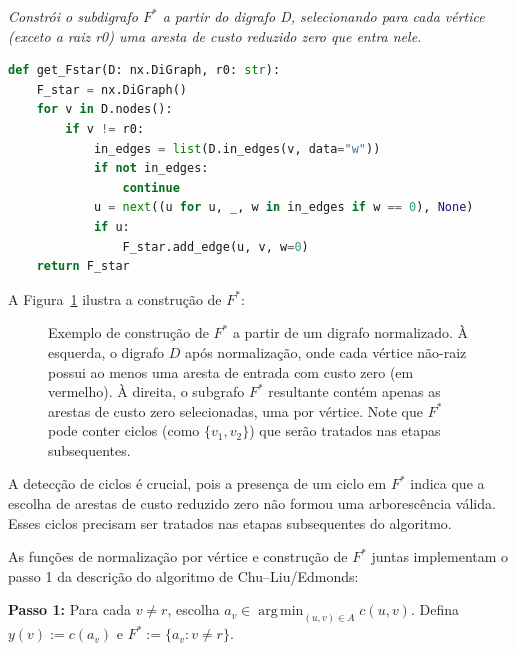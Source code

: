 \begin{tcolorbox}[
        enhanced, breakable,
        colframe=blue!60!black, colback=blue!2,
        colbacktitle=blue!15, coltitle=black,
        title={Construção de F star },
        boxed title style={sharp corners, boxrule=0.6pt},
        sharp corners, boxrule=0.6pt
    ]
    \emph{Constrói o subdigrafo $F^*$ a partir do digrafo D, selecionando para cada vértice (exceto a raiz r0) uma aresta de custo reduzido zero que entra nele.}
    \tcblower
    \begin{lstlisting}[mathescape=true, language=Python]
def get_Fstar(D: nx.DiGraph, r0: str):
    F_star = nx.DiGraph()
    for v in D.nodes():
        if v != r0:
            in_edges = list(D.in_edges(v, data="w"))
            if not in_edges:
                continue
            u = next((u for u, _, w in in_edges if w == 0), None)
            if u:
                F_star.add_edge(u, v, w=0)
    return F_star
\end{lstlisting}
\end{tcolorbox}

A Figura~\ref{fig:get-fstar-example} ilustra a construção de \(F^*\):

\begin{figure}[H]
    \centering
    
    \caption{Exemplo de construção de \(F^*\) a partir de um digrafo normalizado. À esquerda, o digrafo \(D\) após normalização, onde cada vértice não-raiz possui ao menos uma aresta de entrada com custo zero (em vermelho). À direita, o subgrafo \(F^*\) resultante contém apenas as arestas de custo zero selecionadas, uma por vértice. Note que \(F^*\) pode conter ciclos (como \(\{v_1, v_2\}\)) que serão tratados nas etapas subsequentes.}
    \label{fig:get-fstar-example}
\end{figure}

A detecção de ciclos é crucial, pois a presença de um ciclo em \(F^*\) indica que a escolha de arestas de custo reduzido zero não formou uma arborescência válida. Esses ciclos precisam ser tratados nas etapas subsequentes do algoritmo.

As funções de normalização por vértice e construção de \(F^*\) juntas implementam o passo 1 da descrição do algoritmo de Chu–Liu/Edmonds:

\begin{tcolorbox}[
        enhanced, breakable,
        colframe=green!60!black, colback=green!5,
        colbacktitle=green!20, coltitle=black,
        title={Passo 1 do Algoritmo de Chu–Liu/Edmonds},
        boxed title style={sharp corners, boxrule=0.6pt},
        sharp corners, boxrule=0.6pt
    ]
    \textbf{Passo 1:} Para cada \(v\neq r\), escolha \(a_v\in\mathop{\mathrm{arg\,min}}_{(u,v)\in A} c(u,v)\). Defina \(y(v):=c(a_v)\) e \(F^*:=\{a_v : v\neq r\}\).
\end{tcolorbox}



